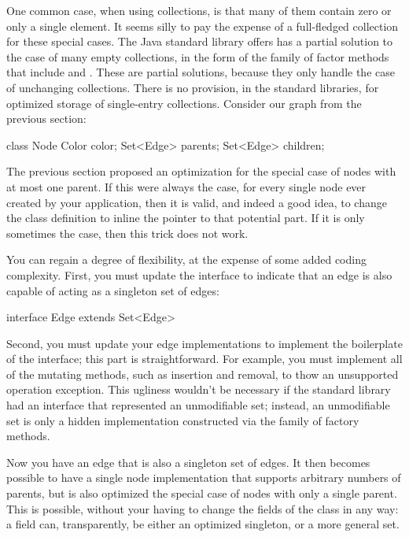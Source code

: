 One common case, when using collections, is that many of them contain zero or
only a single element. It seems silly to pay the expense of a full-fledged
collection for these special cases. The Java standard library offers has a
partial solution to the case of many empty collections, in the form of the family
of factor methods that include  and
.
These are partial solutions, because they only handle the case of unchanging
collections. There is no provision, in the standard libraries, for optimized
storage of single-entry collections. Consider our graph from the previous
section:
\begin{shortlisting}
class Node {
	Color color;
	Set<Edge> parents;
	Set<Edge> children;
}
\end{shortlisting}
The previous section proposed an optimization for the special case of nodes with
at most one parent. If this were always the case, for every single node ever
created by your application, then it is valid, and indeed a good idea,
to change the  class definition to inline the pointer to that
potential part. If it is only sometimes the case, then this trick does not work.

You can regain a degree of flexibility, at the expense of some added coding
complexity. First, you must update the  interface to indicate that an
edge is also capable of acting as a singleton set of edges:
\begin{shortlisting}
interface Edge extends Set<Edge> {
}
\end{shortlisting}

Second, you must update your edge implementations to implement the boilerplate of
the  interface; this part is straightforward. For example,
you must implement all of the mutating methods, such as insertion and removal,
to thow an unsupported operation exception. This ugliness wouldn't be necessary
if the standard library had an interface that represented an unmodifiable set;
instead, an unmodifiable set is only a hidden implementation constructed via
the  family of factory methods.

Now you have an edge that is also a singleton set of edges. It then becomes
possible to have a single node implementation that supports arbitrary numbers of
parents, but is also optimized the special case of nodes with only a single
parent. This is possible, without your having to change the fields of the
 class in any way: a field  can,
transparently, be either an optimized singleton, or a more general set.

